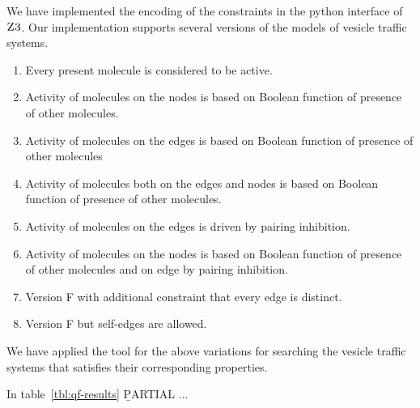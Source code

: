 We have implemented the encoding of the constraints
in the python interface of $\textsc{Z3}$.
%
Our implementation supports several versions of the
models of vesicle traffic systems.

\begin{enumerate}[label=\Alph*]
\item Every present molecule is considered to be active.
\item Activity of molecules on the nodes is based on Boolean function of presence of other molecules. 
\item Activity of molecules on the edges is based on Boolean function of presence of other molecules
\item Activity of molecules both on the edges and nodes is based on Boolean function of presence of other molecules.
\item Activity of molecules on the edges is driven by pairing inhibition.
\item Activity of molecules on the nodes is based on Boolean function of presence of other molecules and on edge by pairing inhibition.
\item Version F with additional constraint that every edge is distinct.
\item Version F but self-edges are allowed.
\end{enumerate}

We have applied the tool for the above variations
for searching the vesicle traffic systems that satisfies
their corresponding properties.



In table~\ref{tbl:qf-results} 
\b PARTIAL ...


